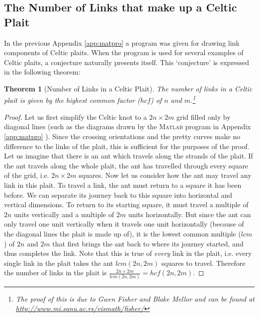 \documentclass[10pt,a4paper]{report}
\newtheorem{theorem}{Theorem}[section]
\theoremstyle{definition}
\theoremstyle{remark}
\theoremstyle{example}
\begin{document}
\begin{appendices}
 \section{The Number of Links that make up a Celtic Plait} \label{app:numlin}
  In the previous Appendix \ref{app:matpro} a program was given for drawing link components of Celtic plaits. When the program is used for several examples of Celtic plaits, a conjecture naturally presents itself. This `conjecture' is expressed in the following theorem:
  \begin{theorem}[Number of Links in a Celtic Plait]
  The number of links in a Celtic plait is given by the highest common factor ($hcf$) of $n$ and $m$.\footnote{The proof of this is due to Gwen Fisher and Blake Mellor and can be found at \url{http://www.mi.sanu.ac.rs/vismath/fisher/}}
  \end{theorem}
  \begin{proof}
  Let us first simplify the Celtic knot to a $2n\times2m$ grid filled only by diagonal lines (such as the diagrams drawn by the \textsc{Matlab} program in Appendix \ref{app:matpro} %
  ). Since the crossing orientations and the pretty curves make no difference to the links of the plait, this is sufficient for the purposes of the proof. Let us imagine that there is an ant which travels along the strands of the plait. If the ant travels along the whole plait, the ant has travelled through every square of the grid, i.e. $2n\times2m$ squares. Now let us consider how the ant may travel any link in this plait. To travel a link, the ant must return to a square it has been before. We can separate its journey back to this square into horizontal and vertical dimensions. To return to its starting square, it must travel a multiple of $2n$ units vertically and a multiple of $2m$ units horizontally. But since the ant can only travel one unit vertically when it travels one unit horizontally (because of the diagonal lines the plait is made up of), it is the lowest common multiple ($lcm$) of $2n$ and $2m$ that first brings the ant back to where its journey started, and thus completes the link. Note that this is true of \emph{every} link in the plait, i.e. every single link in the plait takes the ant $lcm(2n,2m)$ squares to travel. Therefore the number of links in the plait is $\frac{2n\times2m}{lcm(2n,2m)} = hcf(2n,2m)$.
  \end{proof}
  
 \end{appendices}
\end{document}
